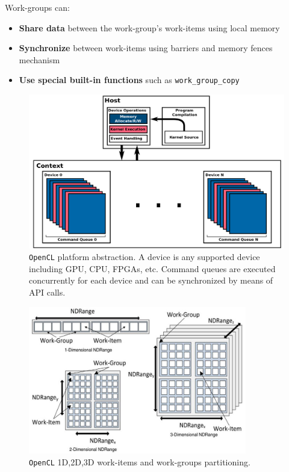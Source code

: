 \begin{description}
    Work-groups can:
    \begin{itemize}
		\item \textbf{Share data} between the work-group's work-items using local memory
		\item \textbf{Synchronize} between work-items using barriers and memory fences mechanism
		\item \textbf{Use special built-in functions} such as \texttt{work\_group\_copy}
    \end{itemize}

    \begin{figure}
	\centering
	\includegraphics[width=1.0\textwidth]{./images/parallel_programming/openCL}
	\caption[\texttt{OpenCL} platform abstraction.]{\texttt{OpenCL} platform abstraction. A device is any supported device including GPU, CPU, FPGAs, etc. Command queues are executed concurrently for each device and can be synchronized by means of API calls.}
	\label{fig:openCL_platform}
\end{figure}

    \begin{figure}
	\centering
	\includegraphics[width=0.85\textwidth]{./images/parallel_programming/opencl_execmodel}
	\caption{\texttt{OpenCL} 1D,2D,3D work-items and work-groups partitioning. }
	\label{fig:opencl_execmodel}
\end{figure}


\end{description}
